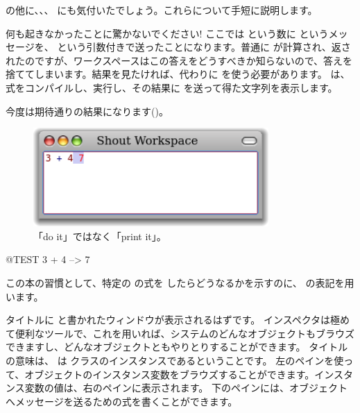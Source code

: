 \documentclass[a4paper,10pt,twoside]{book}
\begin{document}
 の他に、、、 にも気付いたでしょう。これらについて手短に説明します。


何も起きなかったことに驚かないでください! ここでは  という数に \ct{+} というメッセージを、 という引数付きで送ったことになります。普通に  が計算され、返されたのですが、ワークスペースはこの答えをどうすべきか知らないので、答えを捨ててしまいます。結果を見たければ、代わりに  を使う必要があります。 は、式をコンパイルし、実行し、その結果に  を送って得た文字列を表示します。

今度は期待通りの結果になります()。

\begin{figure}[htb]
\centerline {\includegraphics[width=0.8\textwidth]{PrintIt}}
\caption{「do it」ではなく「print it」。}
\end{figure}

\begin{code}{@TEST}
3 + 4 --> 7
\end{code}
\noindent
この本の習慣として、特定の \pharo の式を  したらどうなるかを示すのに、\ct{-->} の表記を用います。

\noindent
タイトルに  と書かれたウィンドウが表示されるはずです。
インスペクタは極めて便利なツールで、これを用いれば、システムのどんなオブジェクトもブラウズできますし、どんなオブジェクトともやりとりすることができます。
タイトルの意味は、 は  クラスのインスタンスであるということです。
左のペインを使って、オブジェクトのインスタンス変数をブラウズすることができます。インスタンス変数の値は、右のペインに表示されます。
下のペインには、オブジェクトへメッセージを送るための式を書くことができます。
\end{document}
